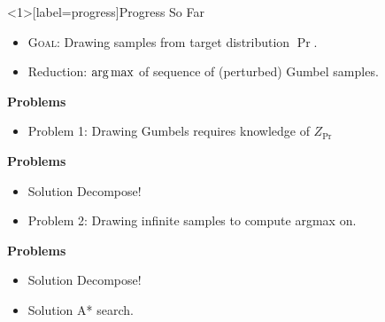 \begin{frame}<1>[label=progress]{Progress So Far}
  \begin{itemize}[<+->]
  \item \textsc{Goal}: Drawing samples from target distribution $\Pr$.
  \item Reduction: $\operatorname*{{arg\,max}}$ of sequence of (perturbed) Gumbel samples. %
  \end{itemize}
  \begin{overprint}

    \textbf{Problems}
    \begin{itemize}
    \item {\color{red}Problem 1:} Drawing Gumbels requires knowledge of $Z_{\Pr}$        %
    \end{itemize}

    \textbf{Problems}
    \begin{itemize} 
    \item {\color{blue} Solution} Decompose! %
    \item {\color{red} Problem 2:} Drawing infinite samples to compute argmax on. %
    \end{itemize}

    \textbf{Problems}
    \begin{itemize} 
    \item {\color{blue} Solution} Decompose! %
    \item {\color{blue} Solution} A* search.
    \end{itemize}
  \end{overprint}
\end{frame}



